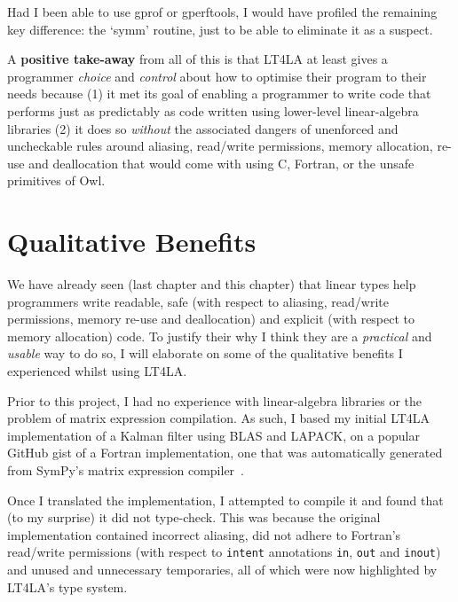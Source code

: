 Had I been able to use gprof or gperftools, I would have profiled the remaining
key difference: the `symm' routine, just to be able to eliminate it as a
suspect.

A \textbf{positive take-away} from all of this is that LT4LA at least gives a
programmer \emph{choice} and \emph{control} about how to optimise their program
to their needs because (1) it met its goal of enabling a programmer to write
code that performs just as predictably as code written using lower-level
linear-algebra libraries (2) it does so \emph{without} the associated dangers
of unenforced and uncheckable rules around aliasing, read/write permissions,
memory allocation, re-use and deallocation that would come with using C,
Fortran, or the unsafe primitives of Owl.

\section{Qualitative Benefits}\label{sec:qual_benefits}

We have already seen (last chapter and this chapter) that linear types help
programmers write readable, safe (with respect to aliasing, read/write
permissions, memory re-use and deallocation) and explicit (with respect to
memory allocation) code. To justify their why I think they are a
\emph{practical} and \emph{usable} way to do so, I will elaborate on some of
the qualitative benefits I experienced whilst using LT4LA.

Prior to this project, I had no experience with linear-algebra libraries or the
problem of matrix expression compilation. As such, I based my initial LT4LA
implementation of a Kalman filter using BLAS and LAPACK, on a popular GitHub
gist of a Fortran implementation, one that was automatically generated from
SymPy's matrix expression compiler~\cite{rocklin_thesis}.

Once I translated the implementation, I attempted to compile it and found that
(to my surprise) it did not type-check. This was because the original
implementation contained incorrect aliasing, did not adhere to Fortran's
read/write permissions (with respect to \texttt{intent} annotations
\texttt{in}, \texttt{out} and \texttt{inout}) and unused and unnecessary
temporaries, all of which were now highlighted by LT4LA's type system.

